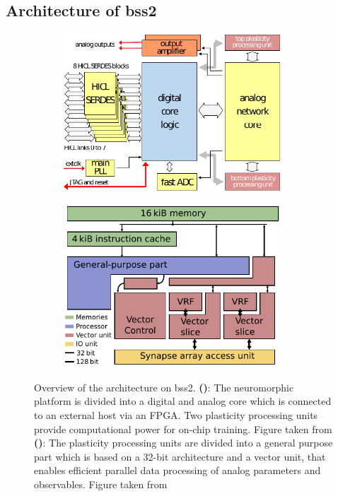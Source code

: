 \subsection{Architecture of \gls{bss2}}
\begin{figure}
	\begin{subfigure}[c]{0.5\textwidth}
		\centering
		\caption{}
		\includegraphics[width=0.9\textwidth]{figures/bss2architecture_wtext.pdf}
		\label{hxstructure}
	\end{subfigure}	
	\begin{subfigure}[c]{0.5\textwidth}
		\centering
		\caption{}
		\includegraphics[width=0.9\textwidth]{figures/ppu_overview.pdf}
		\label{hxppu}
	\end{subfigure}
	\caption[Overview of the architecture on \gls{bss2}]{Overview of the architecture on \gls{bss2}. \textbf{()}: The neuromorphic platform is divided into a digital and analog core which is connected to an external host via an FPGA. Two plasticity processing units provide computational power for on-chip training.  Figure taken from \citealp{schemmel2017internal} \textbf{()}: The plasticity processing units are divided into a general purpose part which is based on a 32-bit architecture and a vector unit, that enables efficient parallel data processing of analog parameters and observables. Figure taken from \citealp{friedmann2016hybridlearning}}
\end{figure}

